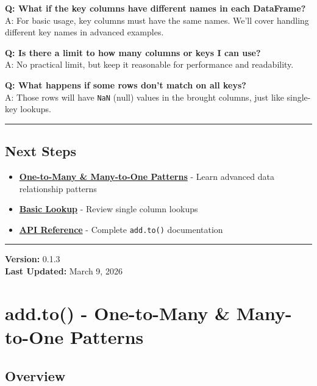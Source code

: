 \documentclass[
  letterpaper,
]{scrbook}
\providecommand{\tightlist}{%
  \setlength{\itemsep}{0pt}\setlength{\parskip}{0pt}}
\begin{document}
\textbf{Q: What if the key columns have different names in each
DataFrame?}\\
A: For basic usage, key columns must have the same names. We'll cover
handling different key names in advanced examples.

\textbf{Q: Is there a limit to how many columns or keys I can use?}\\
A: No practical limit, but keep it reasonable for performance and
readability.

\textbf{Q: What happens if some rows don't match on all keys?}\\
A: Those rows will have \texttt{NaN} (null) values in the brought
columns, just like single-key lookups.

\begin{center}\rule{0.5\linewidth}{0.5pt}\end{center}

\section{Next Steps}\label{next-steps-3}

\begin{itemize}
\tightlist
\item
  \textbf{\href{examples-to-03-patterns.html}{One-to-Many \& Many-to-One
  Patterns}} - Learn advanced data relationship patterns
\item
  \textbf{\href{examples-to-01-basic.html}{Basic Lookup}} - Review
  single column lookups
\item
  \textbf{\href{reference-to-basic.html}{API Reference}} - Complete
  \texttt{add.to()} documentation
\end{itemize}

\begin{center}\rule{0.5\linewidth}{0.5pt}\end{center}

\textbf{Version:} 0.1.3\\
\textbf{Last Updated:} March 9, 2026

\chapter{add.to() - One-to-Many \& Many-to-One
Patterns}\label{add.to---one-to-many-many-to-one-patterns}

\section{Overview}\label{overview-2}
\end{document}
